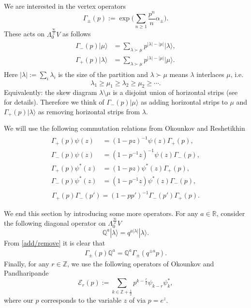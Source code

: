 \documentclass{amsart}
\theoremstyle{definition}
\newcommand{\RR} {\mathbb{R}}		%
\newcommand{\ZZ} {\mathbb{Z}}		%
\newcommand{\QQ} {\mathbb{Q}}		%
\newcommand{\E}{\mathcal{E}}
\begin{document}
We are interested in the vertex operators
$$
\Gamma_{\pm}(p) := \exp \Big( \sum_{n \geq 1} \frac{p^n}{n} \alpha_\pm \Big).
$$
These acts on $\Lambda^{\frac{\infty}{2}}_{0} V$ as follows
\begin{align} \label{add/remove}
\begin{split} 
\Gamma_-(p) |\mu \rangle &= \sum_{\lambda \succ \mu} p^{|\lambda| - |\mu|} |\lambda \rangle, \\ 
\Gamma_+(p) | \lambda \rangle &= \sum_{\lambda \succ \mu} p^{|\lambda| - |\mu|} |\mu \rangle.
\end{split}
\end{align}
Here $|\lambda|:=\sum_i \lambda_i$ is the size of the partition and $\lambda \succ \mu$ means $\lambda$ interlaces $\mu$, i.e.
$$
\lambda_1 \geq \mu_1 \geq \lambda_2 \geq \mu_2 \geq \cdots.
$$
Equivalently: the skew diagram $\lambda \setminus \mu$ is a disjoint union of horizontal strips (see \cite{You} for details). Therefore we think of $\Gamma_-(p) |\mu\rangle$ as adding horizontal strips to $\mu$ and $\Gamma_+(p) |\lambda\rangle$ as removing horizontal strips from $\lambda$. 

We will use the following commutation relations from Okounkov and Reshetikhin \cite{OR}
\begin{align} \label{gammapsi}
\begin{split}
\Gamma_+(p) \psi(z) &= (1-p z)^{-1} \psi(z) \Gamma_+(p), \\
\Gamma_-(p) \psi(z) &= (1-p^{-1} z)^{-1} \psi(z) \Gamma_-(p), \\
\Gamma_+(p) \psi^*(z) &= (1-p z) \psi^*(z) \Gamma_+(p), \\
\Gamma_-(p) \psi^*(z) &= (1-p^{-1} z) \psi^*(z) \Gamma_-(p),
\end{split}
\end{align}
\begin{align} \label{gammapm}
\Gamma_+(p)\Gamma_-(p') = (1-p p')^{-1} \Gamma_-(p')\Gamma_+(p).
\end{align}

We end this section by introducing some more operators. For any $a \in \RR$, consider the following diagonal operator on $\Lambda^{\frac{\infty}{2}}_{0} V$ 
$$
\QQ^a |\lambda\rangle = q^{a|\lambda|} |\lambda\rangle.
$$
From \eqref{add/remove} it is clear that
\begin{align} \label{gammaQ}
\Gamma_{\pm}(p) \QQ^a = \QQ^a \Gamma_{\pm}(q^{\pm a} p).
\end{align}
Finally, for any $r \in \ZZ$, we use the following operators of Okounkov and Pandharipande \cite{OP}
$$
\E_r(p) := \sum_{k \in \ZZ + \frac{1}{2}} p^{k-\frac{r}{2}} \psi_{k-r} \psi_{k}^{*},
$$  
where our $p$ corresponds to the variable $z$ of \cite{OP} via $p=e^z$.
\end{document}
